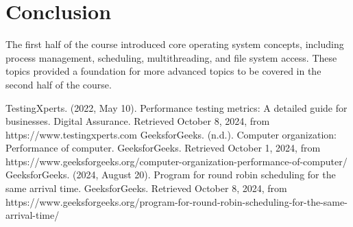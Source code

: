 \documentclass[12pt]{article}
\begin{document}
\section{Conclusion}
The first half of the course introduced core operating system concepts, including process management, scheduling, multithreading, and file system access. These topics provided a foundation for more advanced topics to be covered in the second half of the course.

\begin{thebibliography}{9}
    TestingXperts. (2022, May 10). Performance testing metrics: A detailed guide for businesses. Digital Assurance. Retrieved October 8, 2024, from https://www.testingxperts.com
    GeeksforGeeks. (n.d.). Computer organization: Performance of computer. GeeksforGeeks. Retrieved October 1, 2024, from https://www.geeksforgeeks.org/computer-organization-performance-of-computer/
    GeeksforGeeks. (2024, August 20). Program for round robin scheduling for the same arrival time. GeeksforGeeks. Retrieved October 8, 2024, from https://www.geeksforgeeks.org/program-for-round-robin-scheduling-for-the-same-arrival-time/
\end{thebibliography}
\end{document}
